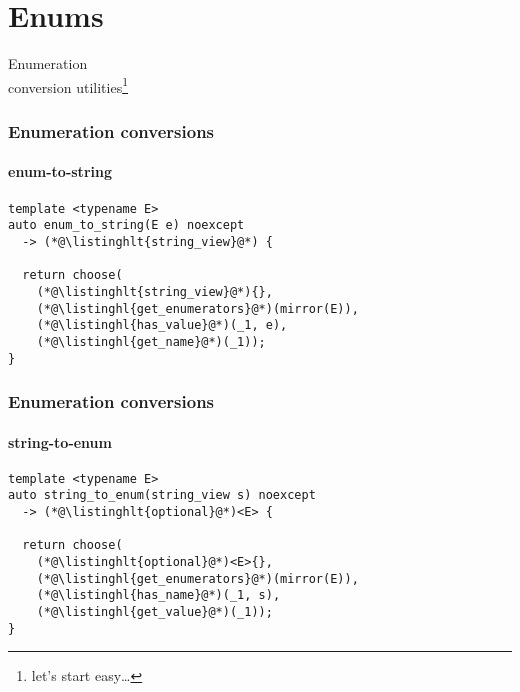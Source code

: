 \documentclass[compress,table,xcolor=table]{beamer}
\begin{document}
\section{Enums}
\begin{frame}[c]
  \Huge
  \centering
  Enumeration\\
  \large
  conversion utilities\footnote{let's start easy\ldots}
\end{frame}
\begin{frame}[fragile]
  \frametitle{Enumeration conversions}
  \framesubtitle{enum-to-string}
  \begin{lstlisting}[language=c++2x]
template <typename E>
auto enum_to_string(E e) noexcept
  -> (*@\listinghlt{string_view}@*) {

  return choose(
    (*@\listinghlt{string_view}@*){},
    (*@\listinghl{get_enumerators}@*)(mirror(E)),
    (*@\listinghl{has_value}@*)(_1, e),
    (*@\listinghl{get_name}@*)(_1));
}
  \end{lstlisting}
\end{frame}
\begin{frame}[fragile]
  \frametitle{Enumeration conversions}
  \framesubtitle{string-to-enum}
  \begin{lstlisting}[language=c++2x]
template <typename E>
auto string_to_enum(string_view s) noexcept
  -> (*@\listinghlt{optional}@*)<E> {

  return choose(
    (*@\listinghlt{optional}@*)<E>{},
    (*@\listinghl{get_enumerators}@*)(mirror(E)),
    (*@\listinghl{has_name}@*)(_1, s),
    (*@\listinghl{get_value}@*)(_1));
}
  \end{lstlisting}
\end{frame}
\end{document}

